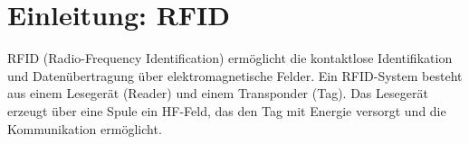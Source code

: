\documentclass[a4paper,11pt]{article}
\begin{document}
  \protokolldeckblatt

  \tableofcontents
  \newpage

  \section*{Einleitung: RFID}
  RFID (Radio-Frequency Identification) ermöglicht die kontaktlose Identifikation und Datenübertragung über elektromagnetische Felder. Ein RFID-System besteht aus einem Lesegerät (Reader) und einem Transponder (Tag). Das Lesegerät erzeugt über eine Spule ein HF-Feld, das den Tag mit Energie versorgt und die Kommunikation ermöglicht.

  
  
  
  
  
  
  
  
  
\end{document}
